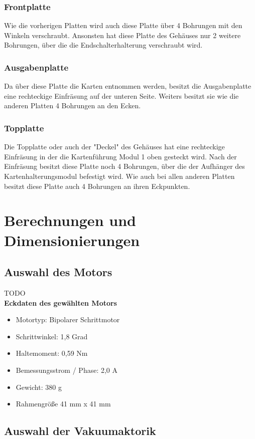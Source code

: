 \subsubsection{Frontplatte}
Wie die vorherigen Platten wird auch diese Platte über 4 Bohrungen mit den Winkeln verschraubt.
Ansonsten hat diese Platte des Gehäuses nur 2 weitere Bohrungen, über die die Endschalterhalterung verschraubt wird.

\subsubsection{Ausgabenplatte}
Da über diese Platte die Karten entnommen werden, besitzt die Ausgabenplatte eine rechteckige Einfräsung auf der unteren
Seite.
Weiters besitzt sie wie die anderen Platten 4 Bohrungen an den Ecken.

\subsubsection{Topplatte}
Die Topplatte oder auch der "Deckel" des Gehäuses hat eine rechteckige Einfräsung in der die Kartenführung Modul 1 oben
gesteckt wird. Nach der Einfräsung besitzt diese Platte noch 4 Bohrungen, über die der Aufhänger des Kartenhalterungsmodul
befestigt wird.
Wie auch bei allen anderen Platten besitzt diese Platte auch 4 Bohrungen an ihren Eckpunkten.

\section{Berechnungen und Dimensionierungen}
\subsection{Auswahl des Motors}
TODO\\
\textbf{Eckdaten des gewählten Motors}
\begin{itemize}
    \item Motortyp: Bipolarer Schrittmotor
    \item Schrittwinkel: 1,8 Grad
    \item Haltemoment: 0,59 Nm
    \item Bemessungsstrom / Phase: 2,0 A
    \item Gewicht: 380 g
    \item Rahmengröße 41 mm x 41 mm
\end{itemize}
\subsection{Auswahl der Vakuumaktorik}

